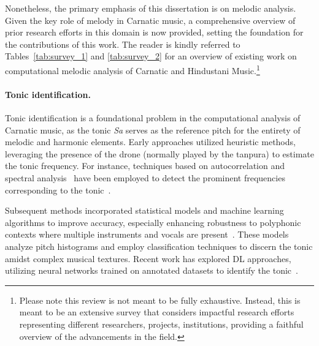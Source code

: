 Nonetheless, the primary emphasis of this dissertation is on melodic analysis. Given the key role of melody in Carnatic music, a comprehensive overview of prior research efforts in this domain is now provided, setting the foundation for the contributions of this work.
%
%
The reader is kindly referred to Tables~\ref{tab:survey_1} and \ref{tab:survey_2} for an overview of existing work on computational melodic analysis of Carnatic and Hindustani Music.\footnote{Please note this review is not meant to be fully exhaustive. Instead, this is meant to be an extensive survey that considers impactful research efforts representing different researchers, projects, institutions, providing a faithful overview of the advancements in the field.}



\paragraph*{Tonic identification.} 
Tonic identification is a foundational problem in the computational analysis of Carnatic music, as the tonic \textit{Sa} serves as the reference pitch for the entirety of melodic and harmonic elements. Early approaches utilized heuristic methods, leveraging the presence of the drone (normally played by the tanpura) to estimate the tonic frequency. For instance, techniques based on autocorrelation and spectral analysis~\citep{decheveigne-yin,rao-pitch,salamon-sinusoid} have been employed to detect the prominent frequencies corresponding to the tonic~\citep{sengupta-tonic,ranjani-tonic,bellur-tonic,salamon-tonic}.

Subsequent methods incorporated statistical models and machine learning algorithms to improve accuracy, especially enhancing robustness to polyphonic contexts where multiple instruments and vocals are present~\citep{gulati-tonic_old,gulati-tonic,aiswarya-tonic}. These models analyze pitch histograms and employ classification techniques to discern the tonic amidst complex musical textures. Recent work has explored \acrshort{DL} approaches, utilizing neural networks trained on annotated datasets to identify the tonic~\citep{singh-tonic}. 

